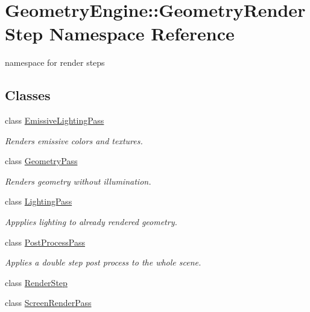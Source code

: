 \hypertarget{namespace_geometry_engine_1_1_geometry_render_step}{}\section{Geometry\+Engine\+::Geometry\+Render\+Step Namespace Reference}
\label{namespace_geometry_engine_1_1_geometry_render_step}


namespace for render steps  


\subsection*{Classes}
\begin{DoxyCompactItemize}
\item 
class \mbox{\hyperlink{class_geometry_engine_1_1_geometry_render_step_1_1_emissive_lighting_pass}{Emissive\+Lighting\+Pass}}
\begin{DoxyCompactList}\small\item\em Renders emissive colors and textures. \end{DoxyCompactList}\item 
class \mbox{\hyperlink{class_geometry_engine_1_1_geometry_render_step_1_1_geometry_pass}{Geometry\+Pass}}
\begin{DoxyCompactList}\small\item\em Renders geometry without illumination. \end{DoxyCompactList}\item 
class \mbox{\hyperlink{class_geometry_engine_1_1_geometry_render_step_1_1_lighting_pass}{Lighting\+Pass}}
\begin{DoxyCompactList}\small\item\em Appplies lighting to already rendered geometry. \end{DoxyCompactList}\item 
class \mbox{\hyperlink{class_geometry_engine_1_1_geometry_render_step_1_1_post_process_pass}{Post\+Process\+Pass}}
\begin{DoxyCompactList}\small\item\em Applies a double step post process to the whole scene. \end{DoxyCompactList}\item 
class \mbox{\hyperlink{class_geometry_engine_1_1_geometry_render_step_1_1_render_step}{Render\+Step}}
\item 
class \mbox{\hyperlink{class_geometry_engine_1_1_geometry_render_step_1_1_screen_render_pass}{Screen\+Render\+Pass}}

\end{DoxyCompactItemize}
